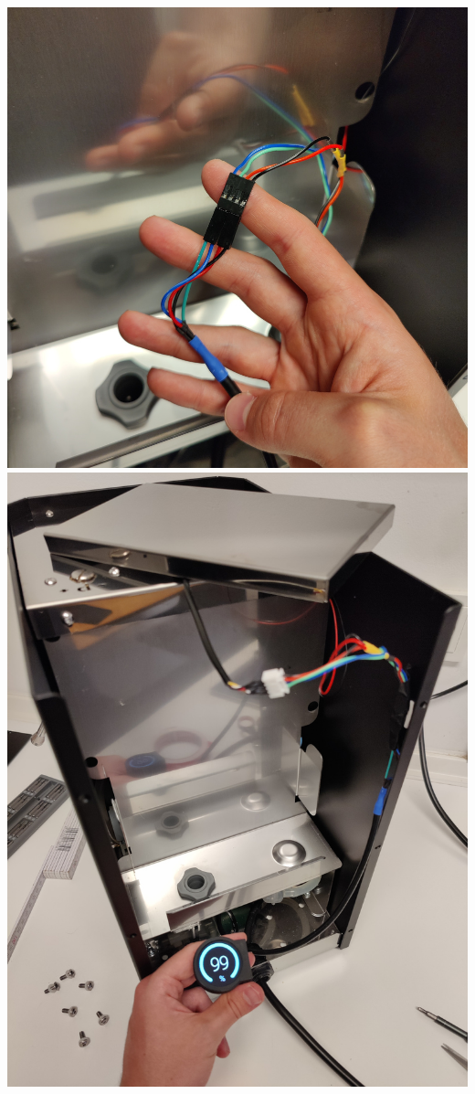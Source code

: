 \documentclass[]{article}
\begin{document}
\begin{minipage}[t]{0.4\linewidth}
	\vspace{0pt}
	\includegraphics[width=\linewidth]{images/03_installation/18_connect_display.jpg}
	\includegraphics[width=\linewidth]{images/03_installation/19_function_check.jpg}
\end{minipage}
\end{document}
